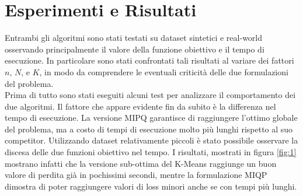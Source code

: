 \documentclass{article}
\begin{document}
    \section{Esperimenti e Risultati}
    Entrambi gli algoritmi sono stati testati su dataset sintetici e real-world osservando principalmente il valore della funzione obiettivo e il tempo di esecuzione. In particolare sono stati confrontati tali risultati al variare dei fattori $n$, $N$, e $K$, in modo da comprendere le eventuali criticità delle due formulazioni del problema.\\
    Prima di tutto sono stati eseguiti alcuni test per analizzare il comportamento dei due algoritmi. Il fattore che appare evidente fin da subito è la differenza nel tempo di esecuzione. La versione MIPQ garantisce di raggiungere l'ottimo globale del problema, ma a costo di tempi di esecuzione molto più lunghi rispetto al suo competitor. Utilizzando dataset relativamente piccoli è stato possibile osservare la discesa delle due funzioni obiettivo nel tempo. I risultati, mostrati in figura \ref{fig:1} mostrano infatti che la versione sub-ottima del K-Means raggiunge un buon valore di perdita già in pochissimi secondi, mentre la formulazione MIQP dimostra di poter raggiungere valori di loss minori anche se con tempi più lunghi.\\
\end{document}
